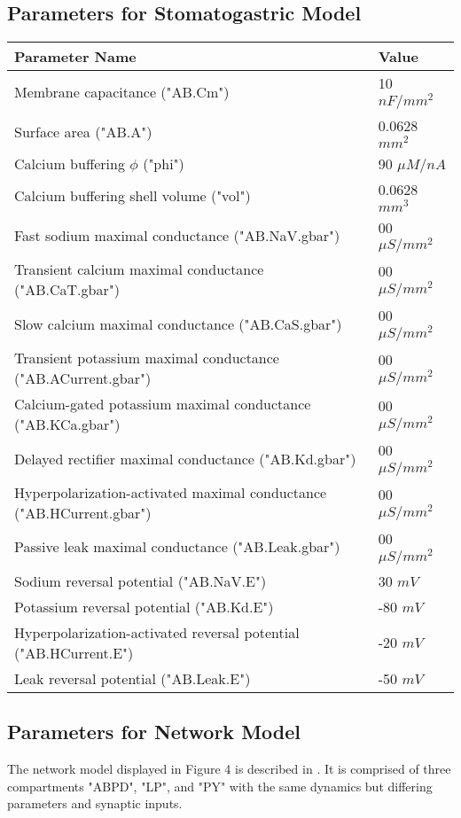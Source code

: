 \documentclass[utf8]{frontiers_suppmat} %
\begin{document}
	\subsection{Parameters for Stomatogastric Model}
	
		\begin{center}
			\begin{tabular}{|l|l|}
				\hline 
				\textbf{Parameter Name} & \textbf{Value} \\ 
				\hline 
				Membrane capacitance ("AB.Cm") & 10 ${nF}/{mm^2}$ \\ 
				\hline 
				Surface area ("AB.A") & 0.0628 $mm^2$ \\
				\hline
				Calcium buffering $\phi$ ("phi") & 90 $\mu M / nA$ \\
				\hline
				Calcium buffering shell volume ("vol") & 0.0628 $mm^3$ \\
				\hline 
				Fast sodium maximal conductance ("AB.NaV.gbar") & 00 $\mu S/mm^2$ \\ 
				\hline
				Transient calcium maximal conductance ("AB.CaT.gbar") & 00 $\mu S/mm^2$ \\ 
				\hline 
				Slow calcium maximal conductance ("AB.CaS.gbar") & 00 $\mu S/mm^2$ \\ 
				\hline 
				Transient potassium maximal conductance ("AB.ACurrent.gbar") & 00 $\mu S/mm^2$ \\ 
				\hline 
				Calcium-gated potassium maximal conductance ("AB.KCa.gbar") & 00 $\mu S/mm^2$ \\ 
				\hline 
				Delayed rectifier maximal conductance ("AB.Kd.gbar") & 00 $\mu S/mm^2$ \\ 
				\hline
				Hyperpolarization-activated maximal conductance ("AB.HCurrent.gbar") & 00 $\mu S/mm^2$ \\ 
				\hline 
				Passive leak maximal conductance ("AB.Leak.gbar") & 00 $\mu S/mm^2$ \\ 
				\hline 
				Sodium reversal potential ("AB.NaV.E") & 30 $mV$ \\ 
				\hline 
				Potassium reversal potential ("AB.Kd.E") & -80 $mV$ \\ 
				\hline
				Hyperpolarization-activated reversal potential ("AB.HCurrent.E") & -20 $mV$ \\
				\hline
				Leak reversal potential ("AB.Leak.E") & -50 $mV$ \\
				\hline
			\end{tabular} 
		\end{center}
	
	\subsection{Parameters for Network Model}
		The network model displayed in Figure 4 is described in \cite{prinzAlternativeHandtuningConductancebased2003, prinzSimilarNetworkActivity2004}. It is comprised of three compartments "ABPD", "LP", and "PY" with the same dynamics but differing parameters and synaptic inputs.
		
\end{document}

